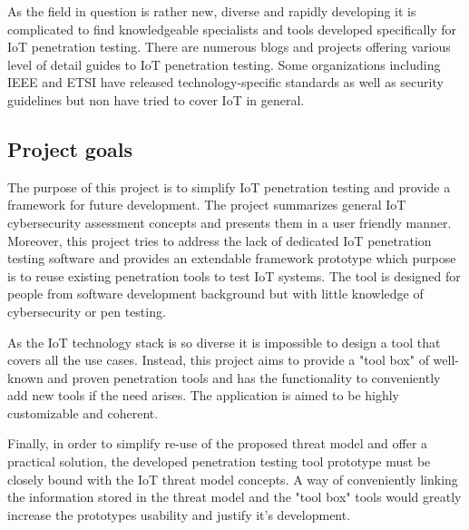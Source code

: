 As the field in question is rather new, diverse and rapidly developing it is complicated to find knowledgeable specialists and tools developed specifically for IoT penetration testing. There are numerous blogs and projects offering various level of detail guides to IoT penetration testing\cite{github}. Some organizations including IEEE and ETSI have released technology-specific standards as well as security guidelines but non have tried to cover IoT in general\cite{Zhao:2013:SIT:2584913.2585964}. 

\subsection{Project goals}
The purpose of this project is to simplify IoT penetration testing and provide a framework for future development. The project summarizes general IoT cybersecurity assessment concepts and presents them in a user friendly manner. Moreover, this project tries to address the lack of dedicated IoT penetration testing software and provides an extendable framework prototype which purpose is to reuse existing penetration tools to test IoT systems. The tool is designed for people from software development background but with little knowledge of cybersecurity or pen testing. 

As the IoT technology stack is so diverse it is impossible to design a tool that covers all the use cases. Instead, this project aims to provide a "tool box" of well-known and proven penetration tools and has the functionality to conveniently add new tools if the need arises. The application is aimed to be highly customizable and coherent.

Finally, in order to simplify re-use of the proposed threat model and offer a practical solution, the developed penetration testing tool prototype must be closely bound with the IoT threat model concepts. A way of conveniently linking the information stored in the threat model and the "tool box" tools would greatly increase the prototypes usability and justify it's development.

